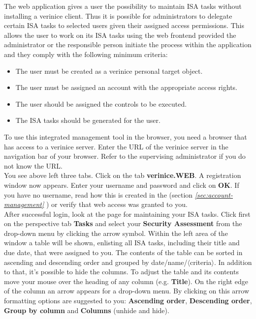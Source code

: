 \documentclass[a4paper,10pt]{book}
\begin{document}
The web application gives a user the possibility to maintain ISA tasks
without installing a verinice client.  Thus it is possible for
administrators to delegate certain ISA tasks to selected users given
their assigned access permissions.  This allows the user to work on
its ISA tasks using the web frontend provided the administrator or the
responsible person initiate the process within the application and
they comply with the following minimum criteria:
\begin{itemize}
 \item The user must be created as a verinice personal target object.
 \item The user must be assigned an account with the appropriate
   access rights.
 \item The user should be assigned the controls to be executed.
 \item The ISA tasks should be generated for the user.
\end{itemize}
To use this integrated management tool in the browser, you need a
browser that has access to a verinice server. Enter the URL of the
verinice server in the navigation bar of your browser. Refer to the
supervising administrator if you do not know the URL.
\newline\\
You see above left three tabs. Click on the tab
\textbf{verinice.\textsc{WEB}}. A registration window now
appears. Enter your username and password and click on \textbf{OK}.
If you have no username, read how this is created in the (section {\em
  \ref{sec:account-management} }) or
verify that web access was granted to you.
\newline\\
After successful login, look at the page for maintaining your ISA
tasks. Click first on the perspective tab \textbf{Tasks} and select
your \textbf{Security Assessment} from the drop-down menu by clicking
the arrow symbol. Within the left area of the window a table will be
shown, enlisting all ISA tasks, including their title and due date,
that were assigned to you. The contents of the table can be sorted in
ascending and descending order and grouped by
date/name/$\langle$criteria$\rangle$. In addition to that, it's
possible to hide the columns.  To adjust the table and its contents
move your mouse over the heading of any column
(e.g. \textbf{Title}). On the right edge of the column an arrow
appears for a drop-down menu. By clicking on this arrow formatting
options are suggested to you: \textbf{Ascending order},
\textbf{Descending order}, \textbf{Group by column} and
\textbf{Columns} (unhide and hide).
\end{document}
